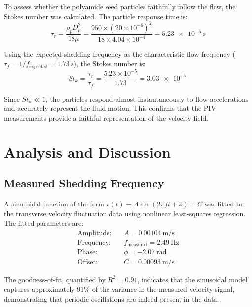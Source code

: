 To assess whether the polyamide seed particles faithfully follow the flow, the Stokes number was calculated. The particle response time is:
\begin{equation}
    \tau_r = \frac{\rho_p D_p^2}{18\mu} = \frac{950 \times (20 \times 10^{-6})^2}{18 \times 4.04 \times 10^{-4}} = \SI{5.23e-5}{\second}
\end{equation}

Using the expected shedding frequency as the characteristic flow frequency (\(\tau_f = 1/f_{\text{expected}} = \SI{1.73}{\second}\)), the Stokes number is:
\begin{equation}
    St_k = \frac{\tau_r}{\tau_f} = \frac{5.23 \times 10^{-5}}{1.73} = \SI{3.03e-5}{}
\end{equation}

Since \(St_k \ll 1\), the particles respond almost instantaneously to flow accelerations and accurately represent the fluid motion. This confirms that the PIV measurements provide a faithful representation of the velocity field.

\section{Analysis and Discussion} \label{sec:analysis}

\subsection{Measured Shedding Frequency} \label{sec:analysis/measured-shedding-frequency}

A sinusoidal function of the form \(v(t) = A \sin(2\pi f t + \phi) + C\) was fitted to the transverse velocity fluctuation data using nonlinear least-squares regression. The fitted parameters are:
\begin{align}
    \text{Amplitude:} \quad & A = \SI{0.00104}{\meter\per\second} \\
    \text{Frequency:} \quad & f_{\text{measured}} = \SI{2.49}{\hertz} \\
    \text{Phase:} \quad & \phi = \SI{-2.07}{\radian} \\
    \text{Offset:} \quad & C = \SI{0.00093}{\meter\per\second}
\end{align}

The goodness-of-fit, quantified by \(R^2 = 0.91\), indicates that the sinusoidal model captures approximately 91\% of the variance in the measured velocity signal, demonstrating that periodic oscillations are indeed present in the data.

